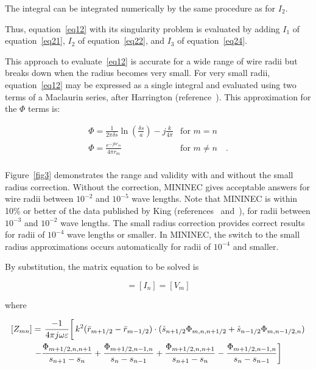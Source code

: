 \documentclass[12pt]{article}
\begin{document}
The integral can be integrated numerically by the same procedure as for
$I_2$.

Thus, equation~\eqref{eq12} with its singularity problem is evaluated by
adding $I_1$ of equation~\eqref{eq21}, $I_2$ of equation~\eqref{eq22}, and
$I_3$ of equation~\eqref{eq24}.

This approach to evaluate~\eqref{eq12} is accurate for a wide range of
wire radii but breaks down when the radius becomes very small. For very
small radii, equation~\eqref{eq12} may be expressed as a single integral
and evaluated using two terms of a Maclaurin series, after Harrington
(reference~\cite{r5}). This approximation for the $\Phi$ terms is:

\begin{equation}
\begin{array}{ll}
\Phi = \frac{1}{2\pi\delta s}\ln\left(\frac{\delta s}{a}\right)
-j\frac{k}{4\pi}                   & \mbox{for } m=n          \\
\Phi = \frac{e^{-jkr_m}}{4\pi r_m} & \mbox{for } m\ne n \quad.\\
\end{array}
\label{eq25}
\end{equation}

Figure~\ref{fig3} demonstrates the range and validity with and without
the small radius correction. Without the correction, MININEC gives
acceptable answers for wire radii between $10^{-2}$ and $10^{-5}$ wave
lengths. Note that MININEC is within 10\% or better of the data
published by King (references~\cite{r8} and~\cite{r9}), for radii
between $10^{-3}$ and $10^{-2}$ wave lengths. The small radius
correction provides correct results for radii of $10^{-4}$ wave lengths
or smaller. In MININEC, the switch to the small radius approximations
occurs automatically for radii of $10^{-4}$ and smaller.

By substitution, the matrix equation to be solved is

\begin{equation}
[Z_{mn}] = [I_n] = [V_m]
\label{eq26}
\end{equation}

where

\begin{equation}
\begin{gathered}
[Z_{mn}] = \left.\frac{-1}{4\pi j\omega\varepsilon}\right[
k^2(\vect{r}_{m+1/2} - \vect{r}_{m-1/2}) \cdot
(\hat{s}_{n+1/2}\Phi_{m,n,n+1/2} + \hat{s}_{n-1/2}\Phi_{m,n-1/2,n}) \\
\left.
-\frac{\Phi_{m+1/2,n,n+1}}{s_{n+1}-s_n}+\frac{\Phi_{m+1/2,n-1,n}}{s_n-s_{n-1}}
+\frac{\Phi_{m+1/2,n,n+1}}{s_{n+1}-s_n}-\frac{\Phi_{m+1/2,n-1,n}}{s_n-s_{n-1}}
\right]\\
\end{gathered}
\label{eq27}
\end{equation}
\end{document}
